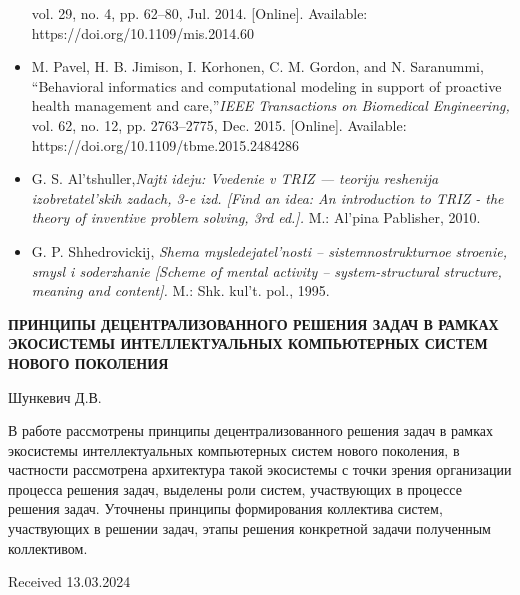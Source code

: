 \documentclass {article}
\begin{document}
\begin{multicols}{2}
\begin{itemize}
vol. 29, no. 4, pp. 62–80, Jul. 2014. [Online]. Available:
https://doi.org/10.1109/mis.2014.60
\renewcommand{\labelitemi}{[28]}
\item
M. Pavel, H. B. Jimison, I. Korhonen, C. M. Gordon, and
N. Saranummi, “Behavioral informatics and computational
modeling in support of proactive health management and
care,”\textit {IEEE Transactions on Biomedical Engineering,} vol. 62,
no. 12, pp. 2763–2775, Dec. 2015. [Online]. Available:
https://doi.org/10.1109/tbme.2015.2484286
\renewcommand{\labelitemi}{[29]}
\item
G. S. Al’tshuller,\textit {Najti ideju: Vvedenie v TRIZ — teoriju reshenija
izobretatel’skih zadach, 3-e izd. [Find an idea: An introduction
to TRIZ - the theory of inventive problem solving, 3rd ed.].} M.:
Al’pina Pablisher, 2010.
\renewcommand{\labelitemi}{[30]}
\item G. P. Shhedrovickij,\textit { Shema mysledejatel’nosti – sistemnostrukturnoe stroenie, smysl i soderzhanie [Scheme of mental
activity – system-structural structure, meaning and content].} M.:
Shk. kul’t. pol., 1995.
\end{itemize}
\columnbreak
\begin{center}
\begin{onehalfspace}
 \textbf{\Large{ПРИНЦИПЫ
ДЕЦЕНТРАЛИЗОВАННОГО РЕШЕНИЯ
ЗАДАЧ В РАМКАХ ЭКОСИСТЕМЫ
ИНТЕЛЛЕКТУАЛЬНЫХ
КОМПЬЮТЕРНЫХ СИСТЕМ НОВОГО
    ПОКОЛЕНИЯ }}
\end{onehalfspace}
 \end{center}
 \setlength{\parskip}{10pt}
\begin{center}
\textup{\Large{Шункевич Д.В.}}\\
 \end{center}
 \large {В работе рассмотрены принципы децентрализованного решения задач в рамках экосистемы интеллектуальных компьютерных систем нового поколения, в
частности рассмотрена архитектура такой экосистемы
с точки зрения организации процесса решения задач,
выделены роли систем, участвующих в процессе решения задач. Уточнены принципы формирования коллектива систем, участвующих в решении задач, этапы
решения конкретной задачи полученным коллективом.}
\parskip=4pt
\begin{flushright}
\setlength{\parskip}{10pt}
    Received 13.03.2024
\end{flushright}
\end{multicols}
\newpage
\end{document}
